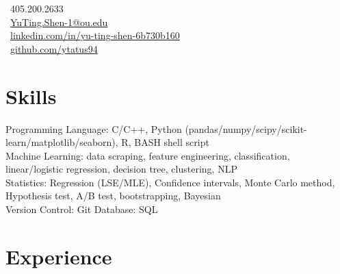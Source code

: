 \documentclass[letterpaper]{deedy-resume-openfont}
\begin{document}
%
%
\lastupdated

%
%

{
    \faPhone \ 405.200.2633\\
    \faEnvelope \ \href{mailto:YuTing.Shen-1@ou.edu}{YuTing.Shen-1@ou.edu}\\
    \faLinkedinSquare \ \href{https://www.linkedin.com/in/yu-ting-shen-6b730b160/}{linkedin.com/in/yu-ting-shen-6b730b160}\\
    \faGithub \ \href{https://github.com/ytatus94}{github.com/ytatus94}
}




\section{Skills}

\raggedright{
    Programming Language:
    C/C++, Python (pandas/numpy/scipy/scikit-learn/matplotlib/seaborn), R, BASH shell script\\
    Machine Learning: data scraping, feature engineering, classification, linear/logistic regression, decision tree, clustering, NLP\\
    Statistics:
    Regression (LSE/MLE), Confidence intervals, Monte Carlo method, Hypothesis test, A/B test, bootstrapping, Bayesian\\
    Version Control:
    Git
    \textbullet{}
    Database:
    SQL\\
}
\sectionsep


\section{Experience}
\end{document}
